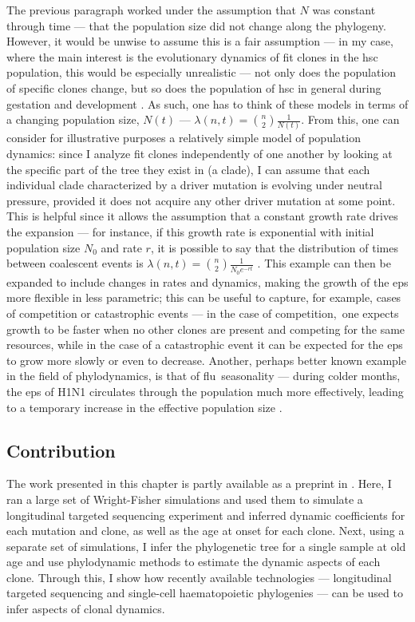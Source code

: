 The previous paragraph worked under the assumption that $N$ was constant through time --- that the population size did not change along the phylogeny. However, it would be unwise to assume this is a fair assumption --- in my case, where the main interest is the evolutionary dynamics of fit clones in the \ac{hsc} population, this would be especially unrealistic --- not only does the population of specific clones change, but so does the population of \ac{hsc} in general during gestation and development \cite{Lee-Six2018-lp}. As such, one has to think of these models in terms of a changing population size, $N(t)$ --- $\lambda(n,t) = \binom{n}{2}\frac{1}{N(t)}$. From this, one can consider for illustrative purposes a relatively simple model of population dynamics: since I analyze fit clones independently of one another by looking at the specific part of the tree they exist in (a clade), I can assume that each individual clade characterized by a driver mutation is evolving under neutral pressure, provided it does not acquire any other driver mutation at some point. This is helpful since it allows the assumption that a constant growth rate drives the expansion --- for instance, if this growth rate is exponential with initial population size $N_0$ and rate $r$, it is possible to say that the distribution of times between coalescent events is $\lambda(n,t) = \binom{n}{2}\frac{1}{N_0 e^{-rt}}$ \cite{Volz2013-ey}. This example can then be expanded to include changes in rates and dynamics, making the growth of the \ac{eps} more flexible in less parametric; this can be useful to capture, for example, cases of competition or catastrophic events --- in the case of competition, one expects growth to be faster when no other clones are present and competing for the same resources, while in the case of a catastrophic event it can be expected for the \ac{eps} to grow more slowly or even to decrease. Another, perhaps better known example in the field of phylodynamics, is that of flu seasonality --- during colder months, the \ac{eps} of H1N1 circulates through the population much more effectively, leading to a temporary increase in the effective population size \cite{Karcher2020-bg}. 

\subsection{Contribution}

The work presented in this chapter is partly available as a preprint in \cite{Fabre2021-uw}. Here, I ran a large set of Wright-Fisher simulations and used them to simulate a longitudinal targeted sequencing experiment and inferred dynamic coefficients for each mutation and clone, as well as the age at onset for each clone. Next, using a separate set of simulations, I infer the phylogenetic tree for a single sample at old age and use phylodynamic methods to estimate the dynamic aspects of each clone. Through this, I show how recently available technologies --- longitudinal targeted sequencing and single-cell haematopoietic phylogenies --- can be used to infer aspects of clonal dynamics.

